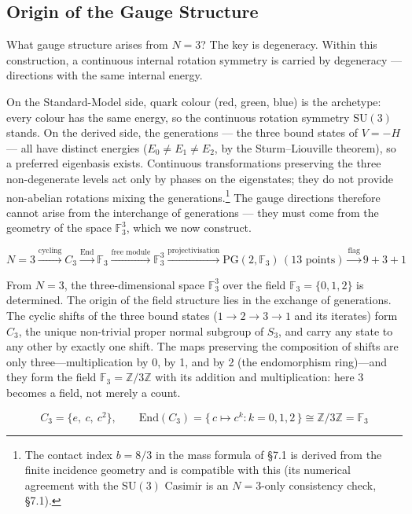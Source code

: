 \documentclass[12pt,a4paper]{article}
\begin{document}
\subsection{Origin of the Gauge Structure}\label{sec:gauge-origin}

What gauge structure arises from $N = 3$?
The key is degeneracy. Within this construction, a continuous internal rotation symmetry is
carried by degeneracy --- directions with the same internal energy.

On the Standard-Model side, quark colour (red, green, blue) is the
archetype: every colour has the same energy, so the continuous
rotation symmetry $\mathrm{SU}(3)$ stands.
On the derived side, the generations --- the three bound states of
$V = -H$ --- all have distinct energies
($E_0 \neq E_1 \neq E_2$, by the Sturm--Liouville theorem),
so a preferred eigenbasis exists.
Continuous transformations preserving the three non-degenerate levels act only by phases on the eigenstates; they do not provide non-abelian rotations mixing the generations.\footnote{The contact index $b = 8/3$ in the mass formula of \S7.1 is derived from the finite incidence geometry and is compatible with this (its numerical agreement with the $\mathrm{SU}(3)$ Casimir is an $N = 3$-only consistency check, \S7.1).}
The gauge directions therefore cannot arise from the interchange of
generations --- they must come from the geometry of the space
$\mathbb{F}_3^3$, which we now construct.

\[N = 3 \xrightarrow{\text{cycling}} C_3 \xrightarrow{\mathrm{End}} \mathbb{F}_3 \xrightarrow{\text{free module}} \mathbb{F}_3^3 \xrightarrow{\text{projectivisation}} \mathrm{PG}(2,\mathbb{F}_3)\,(13\text{ points}) \xrightarrow{\text{flag}} 9{+}3{+}1\]

From $N = 3$, the three-dimensional space
$\mathbb{F}_3^3$ over the field $\mathbb{F}_3 = \{0,1,2\}$
is determined.
The origin of the field structure lies in the exchange of generations. The cyclic shifts of the three bound states ($1 \to 2 \to 3 \to 1$ and its iterates) form $C_3$, the unique non-trivial proper normal subgroup of $S_3$, and carry any state to any other by exactly one shift. The maps preserving the composition of shifts are only three---multiplication by 0, by 1, and by 2 (the endomorphism ring)---and they form the field $\mathbb{F}_3 = \mathbb{Z}/3\mathbb{Z}$ with its addition and multiplication: here 3 becomes a field, not merely a count.

\[C_3 = \{e,\ c,\ c^2\},\qquad \mathrm{End}(C_3) = \{\,c \mapsto c^k : k = 0, 1, 2\,\} \cong \mathbb{Z}/3\mathbb{Z} = \mathbb{F}_3\]
\end{document}
